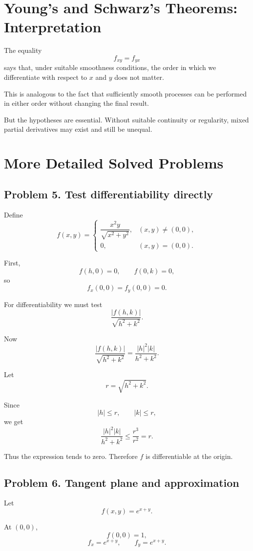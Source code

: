 \documentclass[11pt,oneside]{book}
\theoremstyle{studentthm}
\theoremstyle{definition}
\begin{document}
\section{Young's and Schwarz's Theorems: Interpretation}

The equality
\[
f_{xy}=f_{yx}
\]
says that, under suitable smoothness conditions, the order in which we
differentiate with respect to \(x\) and \(y\) does not matter.

This is analogous to the fact that sufficiently smooth processes can
be performed in either order without changing the final result.

But the hypotheses are essential. Without suitable continuity or
regularity, mixed partial derivatives may exist and still be unequal.

\section{More Detailed Solved Problems}

\subsection*{Problem 5. Test differentiability directly}

Define
\[
f(x,y)
=
\begin{cases}
\dfrac{x^2y}{\sqrt{x^2+y^2}},&(x,y)\ne(0,0),\\
0,&(x,y)=(0,0).
\end{cases}
\]

First,
\[
f(h,0)=0,\qquad f(0,k)=0,
\]
so
\[
f_x(0,0)=f_y(0,0)=0.
\]

For differentiability we must test
\[
\frac{|f(h,k)|}{\sqrt{h^2+k^2}}.
\]

Now
\[
\frac{|f(h,k)|}{\sqrt{h^2+k^2}}
=
\frac{|h|^2|k|}{h^2+k^2}.
\]

Let
\[
r=\sqrt{h^2+k^2}.
\]

Since
\[
|h|\le r,\qquad |k|\le r,
\]
we get
\[
\frac{|h|^2|k|}{h^2+k^2}
\le
\frac{r^3}{r^2}
=
r.
\]

Thus the expression tends to zero. Therefore \(f\) is differentiable
at the origin.

\subsection*{Problem 6. Tangent plane and approximation}

Let
\[
f(x,y)=e^{x+y}.
\]

At \((0,0)\),
\[
f(0,0)=1,
\]
\[
f_x=e^{x+y},
\qquad
f_y=e^{x+y}.
\]
\end{document}
